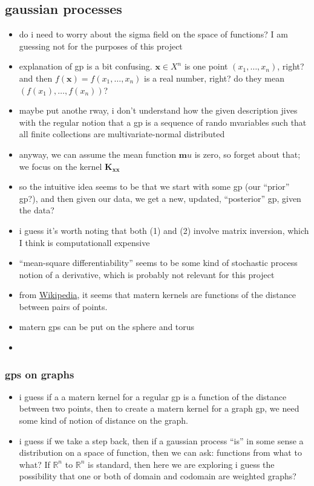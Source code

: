 \documentclass[10pt]{article}
\begin{document}
\subsection{gaussian processes}

\begin{itemize}
    \item do i need to worry about the sigma field on the space of functions? I am guessing not for the purposes of this project
    \item explanation of gp is a bit confusing. $\bm x \in X^n$ is one point $(x_1, \dots, x_n)$, right? and then $f(\bm x) = f(x_1, \dots, x_n)$ is a real number, right? do they mean $\left( f(x_1), \dots, f(x_n) \right)$?
    \item maybe put anothe rway, i don't understand how the given description jives with the regular notion that a gp is a sequence of rando mvariables such that all finite collections are multivariate-normal distributed
    \item anyway, we can assume the mean function $\bm mu$ is zero, so forget about that; we focus on the kernel $\bm{K_{xx}}$
    \item so the intuitive idea seems to be that we start with some gp (our ``prior'' gp?), and then given our data, we get a new, updated, ``posterior'' gp, given the data?
    \item i guess it's worth noting that both (1) and (2) involve matrix inversion, which I think is computationall expensive
    \item ``mean-square differentiability'' seems to be some kind of stochastic process notion of a derivative, which is probably not relevant for this project
    \item from \href{https://en.wikipedia.org/wiki/Mat%C3%A9rn_covariance_function}{Wikipedia}, it seems that matern kernels are functions of the distance between pairs of points.
    \item matern gps can be put on the sphere and torus
    \item 
\end{itemize}

\subsubsection{gps on graphs}

\begin{itemize}
    \item i guess if a a matern kernel for a regular gp is a function of the distance between two points, then to create a matern kernel for a graph gp, we need some kind of notion of distance on the graph.
    \item i guess if we take a step back, then if a gaussian process ``is'' in some sense a distribution on a space of function, then we can ask: functions from what to what? If $\mathbb R^n$ to $\mathbb R^n$ is standard, then here we are exploring i guess the possibility that one or both of domain and codomain are weighted graphs?
\end{itemize}
\end{document}
